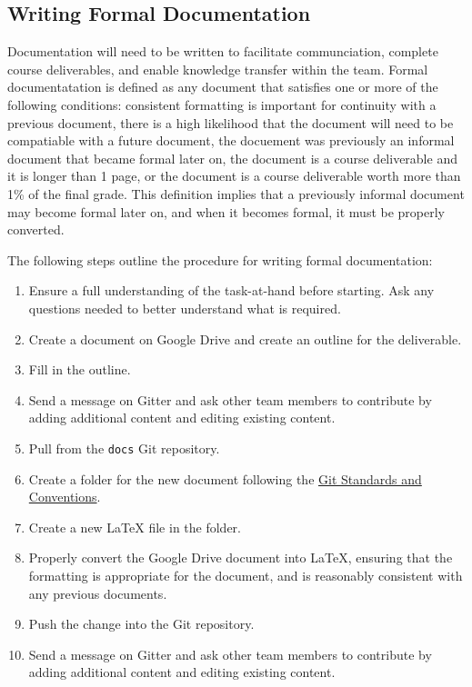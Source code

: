 \documentclass{article}
\begin{document}
\subsection{Writing Formal Documentation}
\label{sec:formal-documentation}
Documentation will need to be written to facilitate communciation, complete course deliverables, and enable knowledge transfer within the team. Formal documentatation is defined as any document that satisfies one or more of the following conditions: consistent formatting is important for continuity with a previous document, there is a high likelihood that the document will need to be compatiable with a future document, the docuement was previously an informal document that became formal later on, the document is a course deliverable and it is longer than 1 page, or the document is a course deliverable worth more than 1\% of the final grade. This definition implies that a previously informal document may become formal later on, and when it becomes formal, it must be properly converted.

The following steps outline the procedure for writing formal documentation:

\begin{enumerate}
\item Ensure a full understanding of the task-at-hand before starting. Ask any questions needed to better understand what is required.
\item Create a document on Google Drive and create an outline for the deliverable.
\item Fill in the outline.
\item Send a message on Gitter and ask other team members to contribute by adding additional content and editing existing content.
\item Pull from the \texttt{docs} Git repository.
\item Create a folder for the new document following the \hyperref[sec:git-conventions]{Git Standards and Conventions}.
\item Create a new LaTeX file in the folder.
\item Properly convert the Google Drive document into LaTeX, ensuring that the formatting is appropriate for the document, and is reasonably consistent with any previous documents.
\item Push the change into the Git repository.
\item Send a message on Gitter and ask other team members to contribute by adding additional content and editing existing content.
\end{enumerate}
\end{document}
